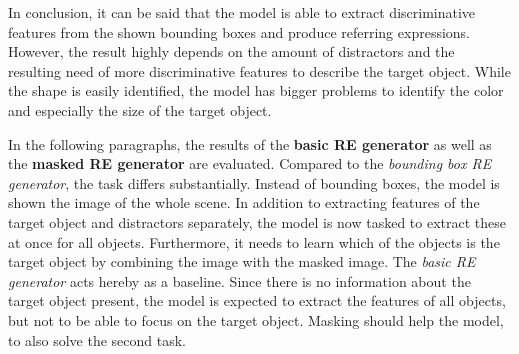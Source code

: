 In conclusion, it can be said that the model is able to extract discriminative features from the shown bounding boxes and produce referring expressions.
However, the result highly depends on the amount of distractors and the resulting need of more discriminative features to describe the target object.
While the shape is easily identified, the model has bigger problems to identify the color and especially the size of the target object.

In the following paragraphs, the results of the \textbf{basic RE generator} as well as the \textbf{masked RE generator} are evaluated.
Compared to the \emph{bounding box RE generator}, the task differs substantially.
Instead of bounding boxes, the model is shown the image of the whole scene.
In addition to extracting features of the target object and distractors separately, the model is now tasked to extract these at once for all objects.
Furthermore, it needs to learn which of the objects is the target object by combining the image with the masked image.
The \emph{basic RE generator} acts hereby as a baseline.
Since there is no information about the target object present, the model is expected to extract the features of all objects, but not to be able to focus on the target object.
Masking should help the model, to also solve the second task.

